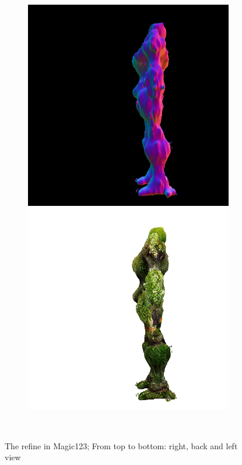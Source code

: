 \begin{figure}[ht]
\begin{subfigure}[b]{0.222\textwidth}
        \includegraphics[width=\textwidth]{etc/a robot made out of plants/magic123/magic123_refine_robot_left_10000_part2.png}
        \includegraphics[width=\textwidth]{etc/a robot made out of plants/magic123/magic123_refine_robot_left_10000_part1.png}
        \caption{}
    \end{subfigure}
    \caption{The refine in Magic123; From top to bottom: right, back and left view}~\label{fig:generationRefineMagic123}
\end{figure}




